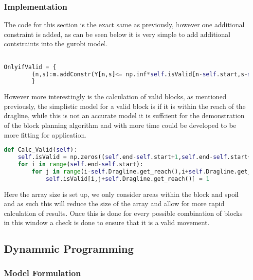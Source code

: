 \subsubsection{Implementation}
The code for this section is the exact same as previously, however one additional constraint is added, as can be seen below it is very simple to add additional contstraints into the gurobi model.
\begin{lstlisting}[language=python]

OnlyifValid = {
		(n,s):m.addConstr(Y[n,s]<= np.inf*self.isValid[n-self.start,s-self.start-self.Dragline.get_reach()]) for n in self.N for s in self.S
		}
\end{lstlisting}
However more interestingly is the calculation of valid blocks, as mentioned previously, the simplistic model for a valid block is if it is within the reach of the dragline, while this is not an accurate model it is suffcient for the demonstration of the block planning algorithm and with more time could be developed to be more fitting for application. 
\begin{lstlisting}[language = python]
def Calc_Valid(self):
	self.isValid = np.zeros((self.end-self.start+1,self.end-self.start+2*self.Dragline.get_reach()+1))
	for i in range(self.end-self.start):
		for j in range(i-self.Dragline.get_reach(),i+self.Dragline.get_reach()):
			self.isValid[i,j+self.Dragline.get_reach()] = 1
\end{lstlisting}
Here the array size is set up, we only consider areas within the block and spoil and as such this will reduce the size of the array and allow for more rapid calculation of results. Once this is done for every possible combination of blocks in this window a check is done to ensure that it is a valid movement. 


\subsection{Dynammic Programming}
\subsubsection{Model Formulation}
